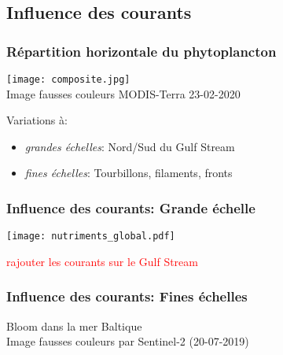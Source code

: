\documentclass[11pt, french, aspectratio=32]{beamer}
\begin{document}

\subsection{Influence des courants}

\begin{frame}
  \frametitle{Répartition horizontale du phytoplancton}
  \begin{beamercolorbox}[sep=0pt, right]{}
    \texttt{[image: composite.jpg]}
    \\
    {\footnotesize Image fausses couleurs MODIS-Terra 23-02-2020}
  \end{beamercolorbox}

  \vfill

  \begin{beamercolorbox}[sep=0pt]{}
    Variations à:
    \begin{itemize}[<+->]
      \item \emph{grandes échelles}: Nord/Sud du Gulf Stream
      \item \emph{fines échelles}: Tourbillons, filaments, \alert{fronts}
    \end{itemize}
  \end{beamercolorbox}
\end{frame}


\begin{frame}
  \frametitle{Influence des courants: Grande échelle}

  \begin{block}{}
    \texttt{[image: nutriments\_global.pdf]}
  \end{block}
  \textcolor{red}{rajouter les courants sur le Gulf Stream}
\end{frame}


{
\begin{frame}
  \frametitle{Influence des courants: Fines échelles}
  \hspace{8cm}
  \begin{minipage}{3.2cm}
    {\raggedright
      Bloom dans la mer Baltique
      \\[1em]
      {\small Image fausses couleurs par Sentinel-2 (20-07-2019)}
    }
  \end{minipage}
\end{frame}
}
\end{document}

